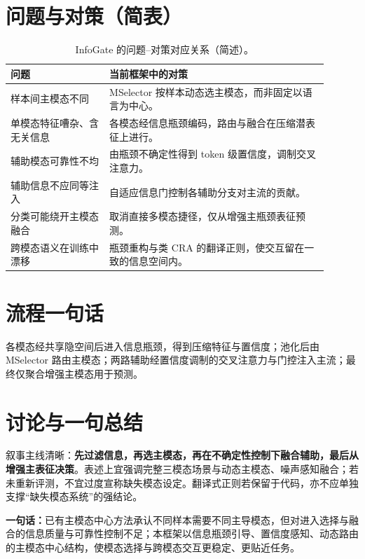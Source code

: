 \documentclass[11pt]{article}
\begin{document}
\section{问题与对策（简表）}

\begin{table}[h]
\centering
\begin{tabular}{>{\raggedright\arraybackslash}p{0.28\linewidth} >{\raggedright\arraybackslash}p{0.62\linewidth}}
\toprule
问题 & 当前框架中的对策 \\
\midrule
样本间主模态不同 & MSelector 按样本动态选主模态，而非固定以语言为中心。 \\
单模态特征嘈杂、含无关信息 & 各模态经信息瓶颈编码，路由与融合在压缩潜表征上进行。 \\
辅助模态可靠性不均 & 由瓶颈不确定性得到 token 级置信度，调制交叉注意力。 \\
辅助信息不应同等注入 & 自适应信息门控制各辅助分支对主流的贡献。 \\
分类可能绕开主模态融合 & 取消直接多模态捷径，仅从增强主瓶颈表征预测。 \\
跨模态语义在训练中漂移 & 瓶颈重构与类 CRA 的翻译正则，使交互留在一致的信息空间内。 \\
\bottomrule
\end{tabular}
\caption{InfoGate 的问题--对策对应关系（简述）。}
\end{table}

\section{流程一句话}

各模态经共享隐空间后进入信息瓶颈，得到压缩特征与置信度；池化后由 MSelector 路由主模态；两路辅助经置信度调制的交叉注意力与门控注入主流；最终仅聚合增强主模态用于预测。

\section{讨论与一句总结}

叙事主线清晰：\textbf{先过滤信息，再选主模态，再在不确定性控制下融合辅助，最后从增强主表征决策}。表述上宜强调完整三模态场景与动态主模态、噪声感知融合；若未重新评测，不宜过度宣称缺失模态设定。翻译式正则若保留于代码，亦不应单独支撑``缺失模态系统''的强结论。

\textbf{一句话：}已有主模态中心方法承认不同样本需要不同主导模态，但对进入选择与融合的信息质量与可靠性控制不足；本框架以信息瓶颈引导、置信度感知、动态路由的主模态中心结构，使模态选择与跨模态交互更稳定、更贴近任务。
\end{document}
